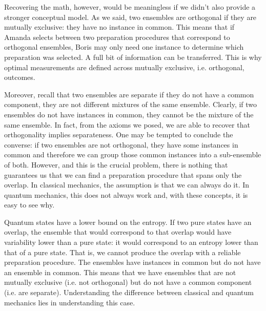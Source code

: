 
Recovering the math, however, would be meaningless if we didn't also provide a stronger conceptual model. As we said, two ensembles are orthogonal if they are mutually exclusive: they have no instance in common. This means that if Amanda selects between two preparation procedures that correspond to orthogonal ensembles, Boris may only need one instance to determine which preparation was selected. A full bit of information can be transferred. This is why optimal measurements are defined across mutually exclusive, i.e. orthogonal, outcomes.

Moreover, recall that two ensembles are separate if they do not have a common component, they are not different mixtures of the same ensemble. Clearly, if two ensembles do not have instances in common, they cannot be the mixture of the same ensemble. In fact, from the axioms we posed, we are able to recover that orthogonality implies separateness. One may be tempted to conclude the converse: if two ensembles are not orthogonal, they have some instances in common and therefore we can group those common instances into a sub-ensemble of both. However, and this is the crucial problem, there is nothing that guarantees us that we can find a preparation procedure that spans only the overlap. In classical mechanics, the assumption is that we can always do it. In quantum mechanics, this does not always work and, with these concepts, it is easy to see why.

Quantum states have a lower bound on the entropy. If two pure states have an overlap, the ensemble that would correspond to that overlap would have variability lower than a pure state: it would correspond to an entropy lower than that of a pure state. That is, we cannot produce the overlap with a reliable preparation procedure. The ensembles have instances in common but do not have an ensemble in common. This means that we have ensembles that are not mutually exclusive (i.e. not orthogonal) but do not have a common component (i.e. are separate). Understanding the difference between classical and quantum mechanics lies in understanding this case.

